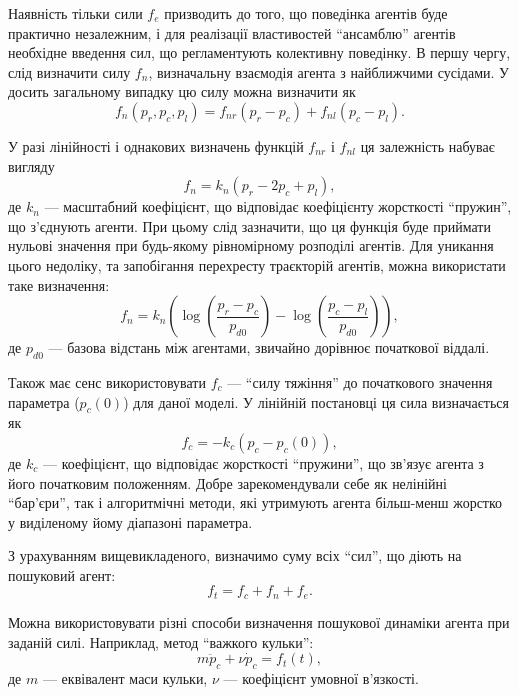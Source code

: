 \documentclass[a4paper,13pt]{atuaref}
\begin{document}
Наявність тільки сили $ f_e $ призводить до того, що поведінка агентів буде
практично незалежним, і для реалізації властивостей ``ансамблю'' агентів
необхідне введення сил, що регламентують колективну поведінку. В першу чергу,
слід визначити силу $f_n$, визначальну взаємодія агента з найближчими
сусідами. У досить загальному випадку цю силу можна визначити як
%
\begin{equation}
  f_n( p_r, p_c, p_l ) = f_{nr}(p_r-p_c) + f_{nl}(p_c-p_l).
  \label{atu:eq:f_n_gen}
\end{equation}

У разі лінійності і однакових визначень функцій $ f_ {nr} $ і $ f_ {nl} $ ця залежність набуває вигляду
%
\begin{equation}
  f_n = k_n ( p_r - 2 p_c + p_l ),
  \label{atu:eq:f_n_lin}
\end{equation}
%
де $ k_n $ --- масштабний коефіцієнт, що відповідає коефіцієнту жорсткості
``пружин'', що з'єднують агенти. При цьому слід зазначити, що ця функція буде
приймати нульові значення при будь-якому рівномірному розподілі агентів.
Для уникання цього недоліку, та запобігання перехресту траєкторій агентів,
можна використати таке визначення:
%
\begin{equation}
  f_n = k_n \left( \log\left( \frac{p_r-p_c}{p_{d0}} \right) -  \log\left( \frac{p_c-p_l}{p_{d0}}\right) \right),
  \label{atu:eq:f_n_log}
\end{equation}
%
де
$p_{d0}$ ---
базова відстань між агентами, звичайно дорівнює початкової віддалі.

Також має сенс використовувати $f_c$ --- ``силу тяжіння'' до початкового значення параметра
($ p_{c}(0) $) для даної моделі. У лінійній постановці ця сила визначається як
%
\begin{equation}
  f_c = -k_c (p_c - p_{c}(0)) ,
  \label{atu:eq:f_c}
\end{equation}
%
де $k_c$ --- коефіцієнт, що відповідає жорсткості ``пружини'',
що зв'язує агента з його початковим положенням.
Добре зарекомендували себе як нелінійні ``бар'єри'',
так і алгоритмічні методи, які утримують агента
більш-менш жорстко у виділеному йому діапазоні параметра.

З урахуванням вищевикладеного, визначимо суму всіх ``сил'',
що діють на пошуковий агент:
\begin{equation}
  f_t = f_c + f_n + f_e .
  \label{atu:eq:f_t}
\end{equation}


Можна використовувати різні способи визначення пошукової динаміки агента при
заданій силі. Наприклад, метод ``важкого кульки'':
\begin{equation}
  m \ddot{p}_c + \nu \dot{p}_c = f_t(t),
  \label{atu:eq:heavy_ball}
\end{equation}
%
де $ m $ --- еквівалент маси кульки, $\nu$ --- коефіцієнт умовної в'язкості.
\end{document}
